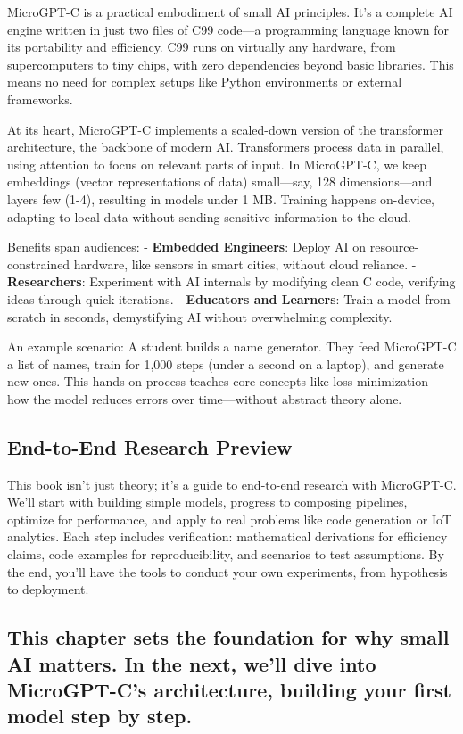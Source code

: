 \documentclass[
]{article}
\begin{document}
MicroGPT-C is a practical embodiment of small AI principles. It's a
complete AI engine written in just two files of C99 code---a programming
language known for its portability and efficiency. C99 runs on virtually
any hardware, from supercomputers to tiny chips, with zero dependencies
beyond basic libraries. This means no need for complex setups like
Python environments or external frameworks.

At its heart, MicroGPT-C implements a scaled-down version of the
transformer architecture, the backbone of modern AI. Transformers
process data in parallel, using attention to focus on relevant parts of
input. In MicroGPT-C, we keep embeddings (vector representations of
data) small---say, 128 dimensions---and layers few (1-4), resulting in
models under 1 MB. Training happens on-device, adapting to local data
without sending sensitive information to the cloud.

Benefits span audiences: - \textbf{Embedded Engineers}: Deploy AI on
resource-constrained hardware, like sensors in smart cities, without
cloud reliance. - \textbf{Researchers}: Experiment with AI internals by
modifying clean C code, verifying ideas through quick iterations. -
\textbf{Educators and Learners}: Train a model from scratch in seconds,
demystifying AI without overwhelming complexity.

An example scenario: A student builds a name generator. They feed
MicroGPT-C a list of names, train for 1,000 steps (under a second on a
laptop), and generate new ones. This hands-on process teaches core
concepts like loss minimization---how the model reduces errors over
time---without abstract theory alone.

\subsection{End-to-End Research
Preview}\label{end-to-end-research-preview}

This book isn't just theory; it's a guide to end-to-end research with
MicroGPT-C. We'll start with building simple models, progress to
composing pipelines, optimize for performance, and apply to real
problems like code generation or IoT analytics. Each step includes
verification: mathematical derivations for efficiency claims, code
examples for reproducibility, and scenarios to test assumptions. By the
end, you'll have the tools to conduct your own experiments, from
hypothesis to deployment.

\subsection{This chapter sets the foundation for why small AI matters.
In the next, we'll dive into MicroGPT-C's architecture, building your
first model step by
step.}\label{this-chapter-sets-the-foundation-for-why-small-ai-matters.-in-the-next-well-dive-into-microgpt-cs-architecture-building-your-first-model-step-by-step.}
\end{document}

